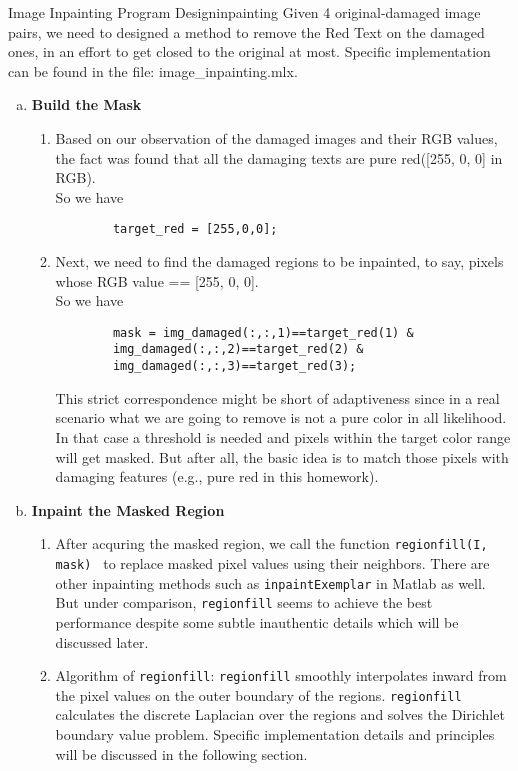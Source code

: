 \begin{problem}{Image Inpainting Program Design}{inpainting}
    Given 4  original-damaged image pairs, we need to designed a method to remove the Red Text on the damaged ones, in an effort to get closed to the original at most. Specific implementation can be found in the file: image\_inpainting.mlx.

\begin{enumerate}[(a)]
    \item \textbf{Build the Mask}
    \begin{enumerate}[label = (\roman*)]
        \item Based on our observation of the damaged images and their RGB values, the fact was found that all the damaging texts are pure red([255, 0, 0] in RGB). \\So we have
        \begin{verbatim}
        target_red = [255,0,0];
        \end{verbatim}
        

        \item Next, we need to find the damaged regions to be inpainted, to say, pixels whose RGB value == [255, 0, 0]. \\ So we have
        \begin{verbatim}
        mask = img_damaged(:,:,1)==target_red(1) &
        img_damaged(:,:,2)==target_red(2) &
        img_damaged(:,:,3)==target_red(3);
        \end{verbatim}
        This strict correspondence might be short of adaptiveness since in a real scenario what we are going to remove is not a pure color in all likelihood. In that case a threshold is needed and pixels within the target color range will get masked. But after all, the basic idea is to match those pixels with damaging features (e.g., pure red in this homework).
    \end{enumerate}

    
    \item \textbf{Inpaint the Masked Region}
        \begin{enumerate}[label = (\roman*)]
            \item After acquring the masked region, we call the function \texttt{regionfill(I, mask) } to replace masked pixel values using their neighbors. There are other inpainting methods such as \texttt{inpaintExemplar} in Matlab as well. But under comparison, \texttt{regionfill} seems to achieve the best performance despite some subtle inauthentic details which will be discussed later.
            \item Algorithm of \texttt{regionfill}: \texttt{regionfill} smoothly interpolates inward from the pixel values on the outer boundary of the regions. \texttt{regionfill} calculates the discrete Laplacian over the regions and solves the Dirichlet boundary value problem.\cite{regionfill_doc} Specific implementation details and principles will be discussed in the following section.
    \end{enumerate}
    
\end{enumerate}
\end{problem}

